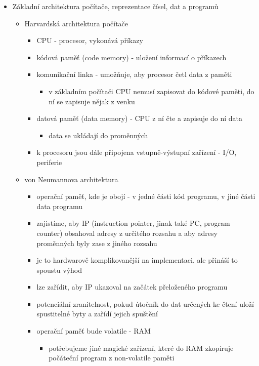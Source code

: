 \begin{itemize}
\item Základní architektura počítače, reprezentace čísel, dat a programů
\begin{itemize}
\item Harvardská architektura počítače
\begin{itemize}
\item CPU - procesor, vykonává příkazy
\item kódová paměť (code memory) - uložení informací o příkazech
\item komunikační linka - umožňuje, aby procesor četl data z paměti
\begin{itemize}
\item v základním počítači CPU nemusí zapisovat do kódové paměti, do ní se zapisuje nějak z venku
\end{itemize}
\item datová paměť (data memory) - CPU z ní čte a zapisuje do ní data
\begin{itemize}
\item data se ukládají do proměnných
\end{itemize}
\item k procesoru jsou dále připojena vstupně-výstupní zařízení - I/O, periferie
\end{itemize}
\item von Neumannova architektura
\begin{itemize}
\item operační paměť, kde je obojí - v jedné části kód programu, v jiné části data programu
\item zajistíme, aby IP (instruction pointer, jinak také PC, program counter) obsahoval adresy z určitého rozsahu a aby adresy proměnných byly zase z jiného rozsahu
\item je to hardwarově komplikovanější na implementaci, ale přináší to spoustu výhod
\item lze zařídit, aby IP ukazoval na začátek přeloženého programu
\item potenciální zranitelnost, pokud útočník do dat určených ke čtení uloží spustitelné byty a zařídí jejich spuštění
\item operační paměť bude volatile - RAM
\begin{itemize}
\item potřebujeme jiné magické zařízení, které do RAM zkopíruje počáteční program z non-volatile paměti
\end{itemize}
\end{itemize}

\end{itemize}
\end{itemize}

